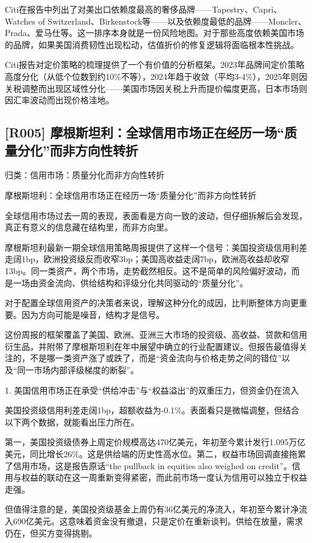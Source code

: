 \documentclass[11pt]{ctexart}
\begin{document}
Citi在报告中列出了对美出口依赖度最高的奢侈品牌——Tapestry、Capri、Watches of Switzerland、Birkenstock等——以及依赖度最低的品牌——Moncler、Prada、爱马仕等。这一排序本身就是一份风险地图。对于那些高度依赖美国市场的品牌，如果美国消费韧性出现松动，估值折价的修复逻辑将面临根本性挑战。

Citi报告对定价策略的梳理提供了一个有价值的分析框架。2023年品牌间定价策略高度分化（从低个位数到约10\%不等），2024年趋于收敛（平均3-4\%），2025年则因关税调整而出现区域性分化——美国市场因关税上升而提价幅度更高，日本市场则因汇率波动而出现价格洼地。

\subsection{[R005] 摩根斯坦利：全球信用市场正在经历一场“质量分化”而非方向性转折}
{\small\color{refgray}归类：信用市场：质量分化而非方向性转折}

摩根斯坦利：全球信用市场正在经历一场“质量分化”而非方向性转折

全球信用市场过去一周的表现，表面看是方向一致的波动，但仔细拆解后会发现，真正有意义的信息藏在结构里，而非方向里。

摩根斯坦利最新一期全球信用策略周报提供了这样一个信号：美国投资级信用利差走阔1bp，欧洲投资级反而收窄3bp；美国高收益走阔7bp，欧洲高收益却收窄13bp。同一类资产，两个市场，走势截然相反。这不是简单的风险偏好波动，而是一场由资金流向、供给结构和评级分化共同驱动的“质量分化”。

对于配置全球信用资产的决策者来说，理解这种分化的成因，比判断整体方向更重要。因为方向可能是噪音，结构才是信号。

这份周报的框架覆盖了美国、欧洲、亚洲三大市场的投资级、高收益、贷款和信用衍生品，并附带了摩根斯坦利在年中展望中确立的行业配置建议。但报告最值得关注的，不是哪一类资产涨了或跌了，而是“资金流向与价格走势之间的错位”以及“同一市场内部评级梯度的断裂”。

1. 美国信用市场正在承受“供给冲击”与“权益溢出”的双重压力，但资金仍在流入

美国投资级信用利差走阔1bp，超额收益为-0.1\%。表面看只是微幅调整，但结合以下两个数据，就能看出压力所在。

第一，美国投资级债券上周定价规模高达470亿美元，年初至今累计发行1.095万亿美元，同比增长26\%。这是供给端的历史性高水位。第二，权益市场回调直接拖累了信用市场，这是报告原话“the pullback in equities also weighed on credit”。信用与权益的联动在这一周重新变得紧密，而此前市场一度认为信用可以独立于权益走强。

但值得注意的是，美国投资级基金上周仍有36亿美元的净流入，年初至今累计净流入690亿美元。这意味着资金没有撤退，只是定价在重新谈判。供给在放量，需求仍在，但买方变得挑剔。
\end{document}
